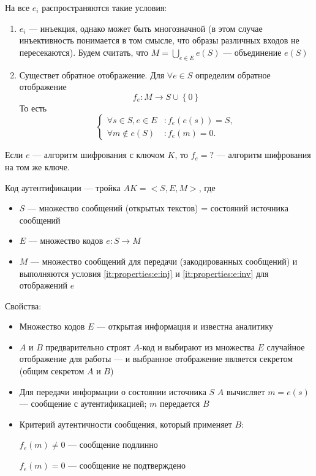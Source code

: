 На все  ${e}_{i}$ распространяются такие условия:
\begin{enumerate}
\item\label{it:properties:e:inj}
  ${e}_{i}$ --- инъекция, однако может быть многозначной (в этом
  случае инъективность понимается в том смысле, что образы различных
  входов не пересекаются).
  Будем считать, что  $M=\bigcup\limits_{e \in E} e\left( S \right)$
  --– объединение $e\left( S \right)$
\item\label{it:properties:e:inv}
  Существет обратное отображение.
  Для  ${\forall}e \in S$ определим обратное отображение
  \begin{equation*}
    {f}_{e}:M\rightarrow S \cup \left\{ 0 \right\}
  \end{equation*}
  То есть
  \begin{equation*}
    \begin{cases}
      \forall s \in S, e \in E&: {f}_{e}\left(e\left(s\right)\right)=S,\\
      \forall m \notin e\left( S \right)&: {f}_{e}\left(m\right)=0.
    \end{cases}
  \end{equation*}
\end{enumerate}


\begin{example}
  Если $e$ –-- алгоритм шифрования с ключом $K$, то  ${f}_{e} = ?$
  --- алгоритм шифрования на том же ключе.
\end{example}

Код аутентификации --– тройка $AK = <S, E, M>$, где 
\begin{itemize}
  \item
    $S$ --- множество сообщений (открытых текстов) = состояний источника
сообщений
  \item
    $E$ --– множество кодов $e:S\rightarrow M$
  \item
    $M$ --– множество сообщений для передачи (закодированных сообщений) и
    выполняются условия \ref{it:properties:e:inj} и \ref{it:properties:e:inv}
    для отображений $e$
\end{itemize}

 Свойства:

\begin{itemize}
  \item
    Множество кодов $E$ --- открытая информация и известна аналитику
  \item
    $A$ и $B$ предварительно строят $A$-код и выбирают из множества $E$
    случайное отображение для работы --- и выбранное отображение является
    секретом (общим секретом $A$ и $B$)
  \item
    Для передачи информации о состоянии источника $S$ $A$ вычисляет 
    $m = e\left( s \right)$ --– сообщение с аутентификацией; $m$ передается $B$
  \item
    Критерий аутентичности сообщения, который применяет $B$:

    ${f}_{e}\left(m\right){\neq}0$ --- сообщение подлинно

    ${f}_{e}\left(m\right)=0$ --- сообщение не подтверждено
\end{itemize}

